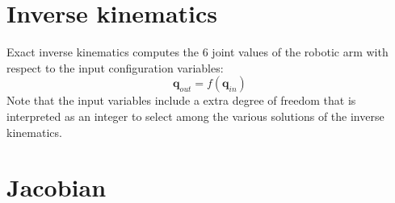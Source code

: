 \documentclass{article}
\newcommand\conf{\mathbf{q}}
\begin{document}
\section{Inverse kinematics}

Exact inverse kinematics computes the 6 joint values of the robotic arm with
respect to the input configuration variables:
\begin{equation}\label{eq:inverse-kinematics}
  \conf_{out} = f(\conf_{in})
\end{equation}
Note that the input variables include a extra degree of freedom that is interpreted as an integer to select among the various solutions of the inverse kinematics.

\section{Jacobian}
\end{document}
